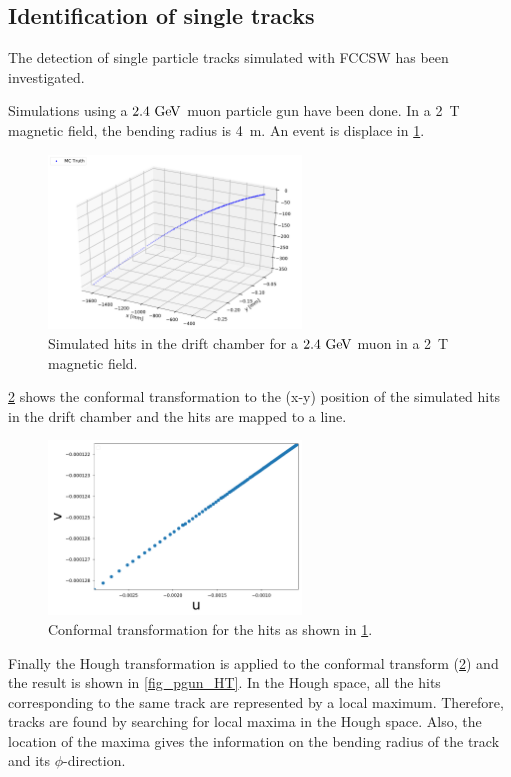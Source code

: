 \subsection{Identification of single tracks}
The detection of single particle tracks simulated with FCCSW has been investigated.

Simulations using a $2.4\,\mathrm{\,Ge\kern -0.1em V}$ muon particle gun have been done. In a 2~T magnetic field, the bending radius is 4~m. An event is displace in \cref{fig_pgun_3d}.

\begin{figure}[ht]
	\centering
	\includegraphics[width=0.6\textwidth]{figures/3D_pgun.pdf}%
	\caption{Simulated hits in the drift chamber for a $2.4\,\mathrm{\,Ge\kern -0.1em V}$ muon in a 2~T magnetic field.}
	\label{fig_pgun_3d}
\end{figure}

\cref{fig_pgun_CT} shows the conformal transformation to the (x-y) position of the simulated hits in the drift chamber and the hits are mapped to a line.

\begin{figure}[ht]
	\centering
	\includegraphics[width=0.6\textwidth]{figures/CT_pgun.pdf}%
	\caption{Conformal transformation for the hits as shown in \cref{fig_pgun_3d}.}
	\label{fig_pgun_CT}
\end{figure}

Finally the Hough transformation is applied to the conformal transform (\cref{fig_pgun_CT}) and the result is shown in \cref{fig_pgun_HT}. In the Hough space, all the hits corresponding to the same track are represented by a local maximum. Therefore, tracks are found by searching for local maxima in the Hough space. Also, the location of the maxima gives the information on the bending radius of the track and its $\phi$-direction.

